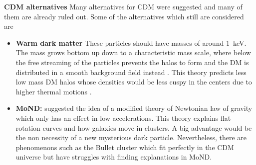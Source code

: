 \textbf{\ac{CDM} alternatives} Many alternatives for \ac{CDM} were suggested and many of them are already ruled out. Some of the alternatives which still are considered are 
\begin{itemize}
    \item \textbf{Warm dark matter} These particles should have masses of around \SI{1}{keV}. The mass grows bottom up down to a characteristic mass scale, where below the free streaming of the particles prevents the halos to form and the \ac{DM} is distributed in a smooth background field instead \citep{Smith...WDM..2011, Schneider...WDM...2013}. This theory predicts less low mass \ac{DM} halos whose densities would be less cuspy in the centers due to higher thermal motions \citep{Bode...WDM...2001}.
    \item \textbf{\ac{MoND}:} \cite{Milgrom...MoND...1983} suggested the idea of a modified theory of Newtonian law of gravity which only has an effect in low accelerations. This theory explains flat rotation curves and how galaxies move in clusters. A big advantage would be the non necessity of a new mysterious dark particle. Nevertheless, there are phenomenons such as the Bullet cluster \citep{Clowe...Bullett...2006} which fit perfectly in the \ac{CDM} universe but have struggles with finding explanations in \ac{MoND}.
\end{itemize}

